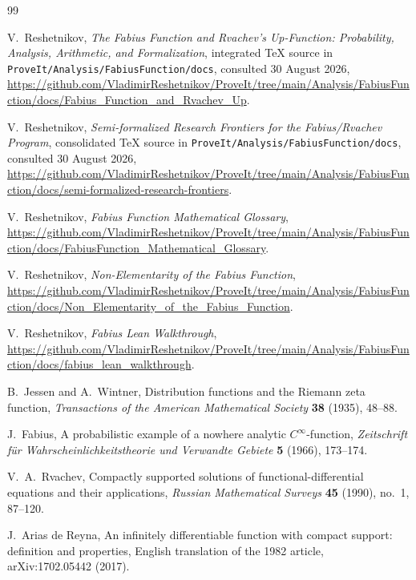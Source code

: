 \documentclass[11pt]{article}
\theoremstyle{definition}
\begin{document}
\begin{thebibliography}{99}

V.~Reshetnikov,
\newblock \emph{The Fabius Function and Rvachev's Up-Function: Probability, Analysis,
Arithmetic, and Formalization},
\newblock integrated TeX source in \texttt{ProveIt/Analysis/FabiusFunction/docs},
consulted 30 August 2026,
\newblock \url{https://github.com/VladimirReshetnikov/ProveIt/tree/main/Analysis/FabiusFunction/docs/Fabius_Function_and_Rvachev_Up}.

V.~Reshetnikov,
\newblock \emph{Semi-formalized Research Frontiers for the Fabius/Rvachev Program},
\newblock consolidated TeX source in \texttt{ProveIt/Analysis/FabiusFunction/docs},
consulted 30 August 2026,
\newblock \url{https://github.com/VladimirReshetnikov/ProveIt/tree/main/Analysis/FabiusFunction/docs/semi-formalized-research-frontiers}.

V.~Reshetnikov,
\newblock \emph{Fabius Function Mathematical Glossary},
\newblock \url{https://github.com/VladimirReshetnikov/ProveIt/tree/main/Analysis/FabiusFunction/docs/FabiusFunction_Mathematical_Glossary}.

V.~Reshetnikov,
\newblock \emph{Non-Elementarity of the Fabius Function},
\newblock \url{https://github.com/VladimirReshetnikov/ProveIt/tree/main/Analysis/FabiusFunction/docs/Non_Elementarity_of_the_Fabius_Function}.

V.~Reshetnikov,
\newblock \emph{Fabius Lean Walkthrough},
\newblock \url{https://github.com/VladimirReshetnikov/ProveIt/tree/main/Analysis/FabiusFunction/docs/fabius_lean_walkthrough}.

B.~Jessen and A.~Wintner,
\newblock Distribution functions and the Riemann zeta function,
\newblock \emph{Transactions of the American Mathematical Society} \textbf{38} (1935),
48--88.

J.~Fabius,
\newblock A probabilistic example of a nowhere analytic \(C^\infty\)-function,
\newblock \emph{Zeitschrift f\"ur Wahrscheinlichkeitstheorie und Verwandte Gebiete}
\textbf{5} (1966), 173--174.

V.~A.~Rvachev,
\newblock Compactly supported solutions of functional-differential equations and their
applications,
\newblock \emph{Russian Mathematical Surveys} \textbf{45} (1990), no.~1, 87--120.

J.~Arias de Reyna,
\newblock An infinitely differentiable function with compact support: definition and
properties,
\newblock English translation of the 1982 article, arXiv:1702.05442 (2017).


\end{thebibliography}
\end{document}
